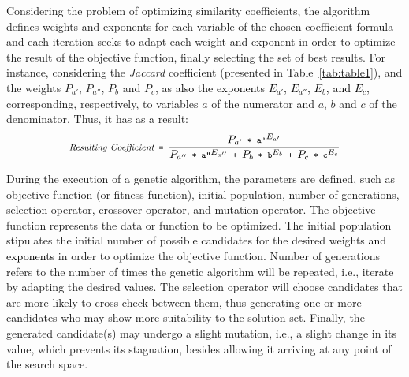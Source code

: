 \documentclass[smallextended,natbib]{svjour3}
\begin{document}
{Considering the problem of optimizing similarity coefficients, the algorithm defines weights and exponents for each variable of the chosen coefficient formula and each iteration seeks to adapt each weight and exponent in order to optimize the result of the objective function, finally selecting the set of best results. For instance, considering the \textit{Jaccard} coefficient (presented in Table~\ref{tab:table1}), and the weights $P_{a'}$, $P_{a''}$, $P_b$ and $P_c$, \textcolor{black}{as also the exponents $E_{a'}$, $E_{a''}$, $E_b$, and $E_c$,} corresponding, respectively, to variables $a$ of the numerator and $a$, $b$ and $c$ of the denominator. Thus, it has as a result:\\[-0.5cm]

\begin{equation}
\label{eq:coefres}
\footnotesize
\textit{Resulting Coefficient}  \texttt{ = }  \frac{P_{a'} \texttt{ * } \texttt{a'}^{E_{a'}}}{P_{a''} \texttt{ * } \texttt{a''}^{E_{a''}}  \texttt{ + }  P_b \texttt{ * } \texttt{b}^{E_b}  \texttt{ + }  P_c \texttt{ * } \texttt{c}^{E_c}}\\
\\[0.3cm]
\end{equation}

During the execution of a genetic algorithm, the parameters are defined, such as objective function (or fitness function), initial population, number of generations, selection operator, crossover operator, and mutation operator. The objective function represents the data or function to be optimized. The initial population stipulates the initial number of possible candidates for the desired weights \textcolor{black}{and exponents} in order to optimize the objective function. Number of generations refers to the number of times the genetic algorithm will be repeated, i.e., iterate by adapting the desired \textcolor{black}{values}. The selection operator will choose candidates that are more likely to cross-check between them, thus generating one or more candidates who may show more suitability to the solution set. Finally, the generated candidate(s) may undergo a slight mutation, i.e., a slight change in its value, which prevents its stagnation, besides allowing it arriving at any point of the search space.

}
\end{document}
